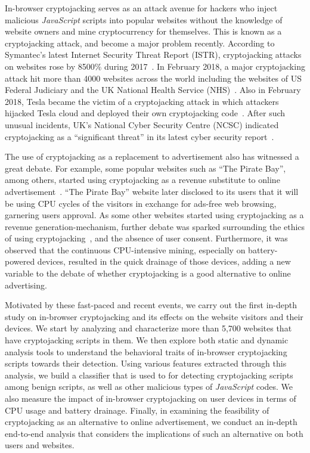 \documentclass[acmlarge]{acmart}
\newcommand{\js}{{\em JavaScript}\xspace}
\newcommand{\cc}{{cryptocurrency}\xspace}
\newcommand{\cj}{cryptojacking\xspace}
\begin{document}
In-browser \cj serves as an attack avenue for hackers who inject malicious \js scripts into popular websites without the knowledge of website owners and mine \cc for themselves. This is known as a \cj attack, and become a major problem recently. According to Symantec's latest Internet Security Threat Report (ISTR), \cj attacks on websites rose by 8500\% during 2017~\cite{Mathur_18,Singh_18}. In February 2018, a major \cj attack hit more than 4000 websites across the world including the websites of US Federal Judiciary and the UK National Health Service (NHS)~\cite{condliffe_18}. Also in February 2018, Tesla became the victim of a \cj attack in which attackers hijacked Tesla cloud and deployed their own \cj code~\cite{Rayome_18}. After such unusual incidents, UK's National Cyber Security Centre (NCSC) indicated \cj as a ``significant threat'' in its latest cyber security report~\cite{de_18,ncsc_18}. 



The use of \cj as a replacement to advertisement also has witnessed a great debate. For example, some popular websites such as ``The Pirate Bay'', among others, started using \cj as a revenue substitute to online advertisement~\cite{Shaikh_17,Ernesto_17,Jones_2017}. ``The Pirate Bay'' website later disclosed to its users that it will be using CPU cycles of the visitors in exchange for ads-free web browsing, garnering users approval. As some other websites started using \cj as a revenue generation-mechanism, further debate was sparked surrounding the ethics of using \cj~\cite{Zuckerman_2018}, and the absence of user consent. Furthermore, it was observed that the continuous CPU-intensive mining, especially on battery-powered devices, resulted in the quick drainage of those devices, adding a new variable to the debate of whether \cj is a good alternative to online advertising. 




Motivated by these fast-paced and recent events, we carry out the first in-depth study on in-browser \cj and its effects on the website visitors and their devices. We start by analyzing and characterize more than 5,700 websites that have \cj scripts in them. We then explore both static and dynamic analysis tools to understand the behavioral traits of in-browser \cj scripts towards their detection. Using various features extracted through this analysis, we build a classifier that is used to for detecting \cj scripts among benign scripts, as well as other malicious types of \js codes. We also measure the impact of in-browser \cj on user devices in terms of CPU usage and battery drainage. Finally, in examining the feasibility of \cj as an alternative to online advertisement, we conduct an in-depth end-to-end analysis that considers the implications of such an alternative on both users and websites.
\end{document}
